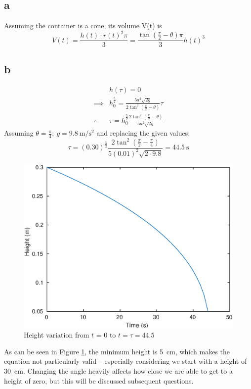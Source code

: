 \subsection{a}
Assuming the container is a cone, its volume V(t) is \begin{equation} \label{eq:V}
    V(t) = \frac{h(t) \cdot {r(t)}^2 \pi}{3} = \frac{ \tan\left( \frac{\pi}{2} - \theta \right) \pi}{3}{h(t)}^3 
\end{equation}

\subsection{b}
\begin{equation}
\begin{align}
    &h(\tau) = 0 \\
    \implies &h_0^{\frac{5}{2}} = \frac{ 5a^2 \sqrt{2g} }{ 2\tan^2\left(\frac{\pi}{2} - \theta\right) } \tau \\
    \therefore \ &\tau = h_0^{\frac{5}{2}} \frac{ 2\tan^2\left(\frac{\pi}{2} - \theta\right) }{ 5a^2 \sqrt{2g} }
\end{align}
\label{eq:tau}
\end{equation}
Assuming $\theta = \frac{\pi}{4}; \ g=\SI{9.8}{\meter\per\second\squared}$ and replacing the given values:
\begin{equation}
    \tau = {(0.30)}^{\frac{5}{2}} \frac{2 \tan^2\left(\frac{\pi}{2} - \frac{\pi}{4} \right)}{ 5{(0.01)}^2 \sqrt{2\cdot 9.8} }
    = \SI{44.5}{\second}
\end{equation}
\begin{figure}[h]
	\includegraphics[scale=0.65, center]{./eps/topic5_b.eps}
	\caption{Height variation from $t$ = 0 to $t=\tau=44.5$ }
	\label{fig:Topic5-b}
\end{figure}
As can be seen in Figure \ref{fig:Topic5-b}, the minimum height is \SI{5}{\centi\meter}, which makes the equation not particularly valid -- especially considering we start with a height of \SI{30}{\centi\meter}.
Changing the angle heavily affects how close we are able to get to a height of zero, but this will be discussed subsequent questions.


